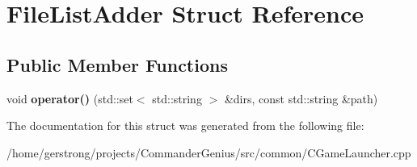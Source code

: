 \hypertarget{struct_file_list_adder}{
\section{FileListAdder Struct Reference}
\label{struct_file_list_adder}
}
\subsection*{Public Member Functions}
\begin{DoxyCompactItemize}
\item 
\hypertarget{struct_file_list_adder_a59e836c24086e8132bddf21eb59c5e30}{
void {\bfseries operator()} (std::set$<$ std::string $>$ \&dirs, const std::string \&path)}
\label{struct_file_list_adder_a59e836c24086e8132bddf21eb59c5e30}

\end{DoxyCompactItemize}


The documentation for this struct was generated from the following file:\begin{DoxyCompactItemize}
\item 
/home/gerstrong/projects/CommanderGenius/src/common/CGameLauncher.cpp\end{DoxyCompactItemize}
